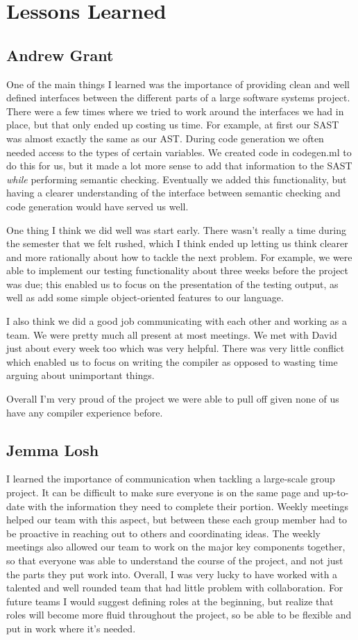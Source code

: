 \documentclass{article}
\begin{document}
\newpage

\section{Lessons Learned}
\subsection{Andrew Grant}
One of the main things I learned was the importance of providing clean and well defined interfaces between the different parts of a large software systems project. There were a few times where we tried to work around the interfaces we had in place, but that only ended up costing us time. For example, at first our SAST was almost exactly the same as our AST. During code generation we often needed access to the types of certain variables. We created code in codegen.ml to do this for us, but it made a lot more sense to add that information to the SAST \emph{while} performing semantic checking. Eventually we added this functionality, but having a clearer understanding of the interface between semantic checking and code generation would have served us well.
\par
One thing I think we did well was start early. There wasn't really a time during the semester that we felt rushed, which I think ended up letting us think clearer and more rationally about how to tackle the next problem. For example, we were able to implement our testing functionality about three weeks before the project was due; this enabled us to focus on the presentation of the testing output, as well as add some simple object-oriented features to our language.
\par
I also think we did a good job communicating with each other and working as a team. We were pretty much all present at most meetings. We met with David just about every week too which was very helpful. There was very little conflict which enabled us to focus on writing the compiler as opposed to wasting time arguing about unimportant things. 
\par
Overall I'm very proud of the project we were able to pull off given none of us have any compiler experience before.
\subsection{Jemma Losh}
I learned the importance of communication when tackling a large-scale group project. It can be difficult to make sure everyone is on the same page and up-to-date with the information they need to complete their portion. Weekly meetings helped our team with this aspect, but between these each group member had to be proactive in reaching out to others and coordinating ideas. The weekly meetings also allowed our team to work on the major key components together, so that everyone was able to understand the course of the project, and not just the parts they put work into. Overall, I was very lucky to have worked with a talented and well rounded team that had little problem with collaboration. For future teams I would suggest defining roles at the beginning, but realize that roles will become more fluid throughout the project, so be able to be flexible and put in work where it's needed.
\end{document}
